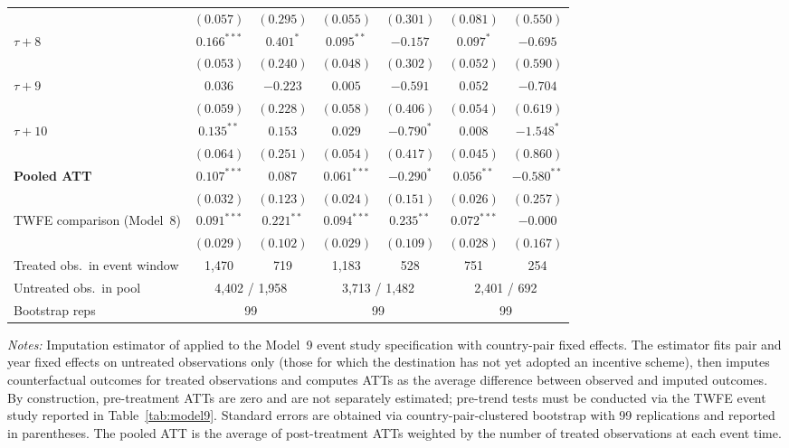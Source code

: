 \begin{table}[htbp]
\begin{tabular}{l cc cc cc }
 & $(0.057)$ & $(0.295)$ & $(0.055)$ & $(0.301)$ & $(0.081)$ & $(0.550)$ \\[2pt]
$\tau+8$ & $0.166^{***}$ & $0.401^{*}$ & $0.095^{**}$ & $-0.157$ & $0.097^{*}$ & $-0.695$ \\
 & $(0.053)$ & $(0.240)$ & $(0.048)$ & $(0.302)$ & $(0.052)$ & $(0.590)$ \\[2pt]
$\tau+9$ & $0.036$ & $-0.223$ & $0.005$ & $-0.591$ & $0.052$ & $-0.704$ \\
 & $(0.059)$ & $(0.228)$ & $(0.058)$ & $(0.406)$ & $(0.054)$ & $(0.619)$ \\[2pt]
$\tau+10$ & $0.135^{**}$ & $0.153$ & $0.029$ & $-0.790^{*}$ & $0.008$ & $-1.548^{*}$ \\
 & $(0.064)$ & $(0.251)$ & $(0.054)$ & $(0.417)$ & $(0.045)$ & $(0.860)$ \\[2pt]
\midrule
\textbf{Pooled ATT} & $\boldsymbol{0.107^{***}}$ & $\boldsymbol{0.087}$ & $\boldsymbol{0.061^{***}}$ & $\boldsymbol{-0.290^{*}}$ & $\boldsymbol{0.056^{**}}$ & $\boldsymbol{-0.580^{**}}$ \\
 & $(0.032)$ & $(0.123)$ & $(0.024)$ & $(0.151)$ & $(0.026)$ & $(0.257)$ \\
\midrule
TWFE comparison (Model~8) & $0.091^{***}$ & $0.221^{**}$ & $0.094^{***}$ & $0.235^{**}$ & $0.072^{***}$ & $-0.000$ \\
 & $(0.029)$ & $(0.102)$ & $(0.029)$ & $(0.109)$ & $(0.028)$ & $(0.167)$ \\
\midrule
Treated obs.\ in event window & 1,470 & 719 & 1,183 & 528 & 751 & 254 \\
Untreated obs.\ in pool & \multicolumn{2}{c}{4,402 / 1,958} & \multicolumn{2}{c}{3,713 / 1,482} & \multicolumn{2}{c}{2,401 / 692} \\
Bootstrap reps & \multicolumn{2}{c}{99} & \multicolumn{2}{c}{99} & \multicolumn{2}{c}{99} \\
\bottomrule
\end{tabular}
\par\vspace{4pt}\noindent\begin{minipage}{\textwidth}
\footnotesize
\par \textit{Notes:} Imputation estimator of \citet{borusyak2024} applied to the Model~9 event study specification with country-pair fixed effects. The estimator fits pair and year fixed effects on untreated observations only (those for which the destination has not yet adopted an incentive scheme), then imputes counterfactual outcomes for treated observations and computes ATTs as the average difference between observed and imputed outcomes. By construction, pre-treatment ATTs are zero and are not separately estimated; pre-trend tests must be conducted via the TWFE event study reported in Table~\ref{tab:model9}. Standard errors are obtained via country-pair-clustered bootstrap with 99 replications and reported in parentheses. The pooled ATT is the average of post-treatment ATTs weighted by the number of treated observations at each event time.

\end{minipage}
\end{table}
